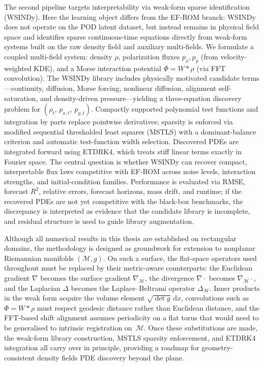 \documentclass{report}
\theoremstyle{plain}
\theoremstyle{remark}
\numberwithin{equation}{section}              %
\begin{document}
The second pipeline targets interpretability via weak-form sparse identification (WSINDy). Here the learning object differs from the EF-ROM branch: WSINDy does not operate on the POD latent dataset, but instead remains in physical field space and identifies sparse continuous-time equations directly from weak-form systems built on the raw density field and auxiliary multi-fields. We formulate a coupled multi-field system: density $\rho$, polarization fluxes $p_x, p_y$ (from velocity-weighted KDE), and a Morse interaction potential $\Phi = W\ast\rho$ (via FFT convolution). The WSINDy library includes physically motivated candidate terms---continuity, diffusion, Morse forcing, nonlinear diffusion, alignment self-saturation, and density-driven pressure---yielding a three-equation discovery problem for $(\rho_t,\, p_{x,t},\, p_{y,t})$. Compactly supported polynomial test functions and integration by parts replace pointwise derivatives; sparsity is enforced via modified sequential thresholded least squares (MSTLS) with a dominant-balance criterion and automatic test-function width selection. Discovered PDEs are integrated forward using ETDRK4, which treats stiff linear terms exactly in Fourier space. The central question is whether WSINDy can recover compact, interpretable flux laws competitive with EF-ROM across noise levels, interaction strengths, and initial-condition families. Performance is evaluated via RMSE, forecast $R^2$, relative errors, forecast horizons, mass drift, and runtime; if the recovered PDEs are not yet competitive with the black-box benchmarks, the discrepancy is interpreted as evidence that the candidate library is incomplete, and residual structure is used to guide library augmentation.

\noindent Although all numerical results in this thesis are established on rectangular domains, the methodology is designed as groundwork for extension to nonplanar Riemannian manifolds $(\mathcal{M}, g)$. On such a surface, the flat-space operators used throughout must be replaced by their metric-aware counterparts: the Euclidean gradient $\nabla$ becomes the surface gradient $\nabla_{\!\mathcal{M}}$, the divergence $\nabla\cdot$ becomes $\nabla_{\!\mathcal{M}}\!\cdot$, and the Laplacian $\Delta$ becomes the Laplace--Beltrami operator $\Delta_{\!\mathcal{M}}$. Inner products in the weak form acquire the volume element $\sqrt{\det g}\,\mathrm{d}x$, convolutions such as $\Phi = W\ast\rho$ must respect geodesic distance rather than Euclidean distance, and the FFT-based shift alignment assumes periodicity on a flat torus that would need to be generalised to intrinsic registration on~$\mathcal{M}$. Once these substitutions are made, the weak-form library construction, MSTLS sparsity enforcement, and ETDRK4 integration all carry over in principle, providing a roadmap for geometry-consistent density fields PDE discovery beyond the plane.
\end{document}
